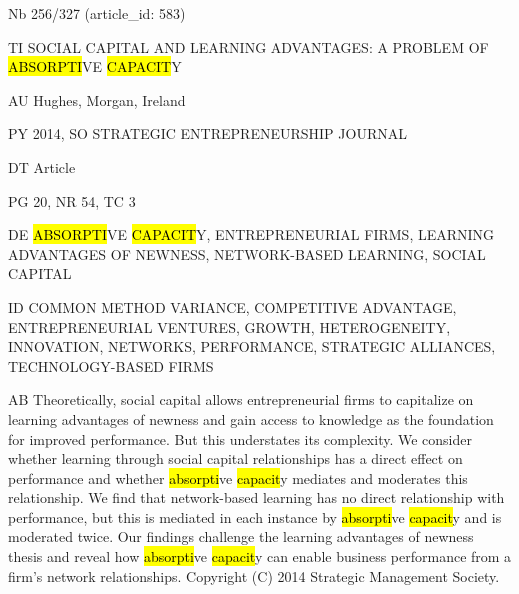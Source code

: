 \documentclass[a4paper]{article}
\begin{document}
\vspace*{-2cm}
Nb \tabto{0cm}256/327 (article\_id: 583)\par
TI \tabto{0cm}SOCIAL CAPITAL AND LEARNING ADVANTAGES: A PROBLEM OF \hl{ABSORPTI}VE \hl{CAPACIT}Y\par
AU \tabto{0cm}Hughes, Morgan, Ireland\par
PY \tabto{0cm}2014, SO STRATEGIC ENTREPRENEURSHIP JOURNAL\par
DT \tabto{0cm}Article\par
PG \tabto{0cm}20, NR 54, TC 3\par
DE \tabto{0cm}\hl{ABSORPTI}VE \hl{CAPACIT}Y, ENTREPRENEURIAL FIRMS, LEARNING ADVANTAGES OF NEWNESS, NETWORK-BASED LEARNING, SOCIAL CAPITAL\par
ID \tabto{0cm}COMMON METHOD VARIANCE, COMPETITIVE ADVANTAGE, ENTREPRENEURIAL VENTURES, GROWTH, HETEROGENEITY, INNOVATION, NETWORKS, PERFORMANCE, STRATEGIC ALLIANCES, TECHNOLOGY-BASED FIRMS\par
AB \tabto{0cm}Theoretically, social capital allows entrepreneurial firms to capitalize on learning advantages of newness and gain access to knowledge as the foundation for improved performance. But this understates its complexity. We consider whether learning through social capital relationships has a direct effect on performance and whether \hl{absorpti}ve \hl{capacit}y mediates and moderates this relationship. We find that network-based learning has no direct relationship with performance, but this is mediated in each instance by \hl{absorpti}ve \hl{capacit}y and is moderated twice. Our findings challenge the learning advantages of newness thesis and reveal how \hl{absorpti}ve \hl{capacit}y can enable business performance from a firm's network relationships. Copyright (C) 2014 Strategic Management Society.\par
\clearpage
\end{document}
